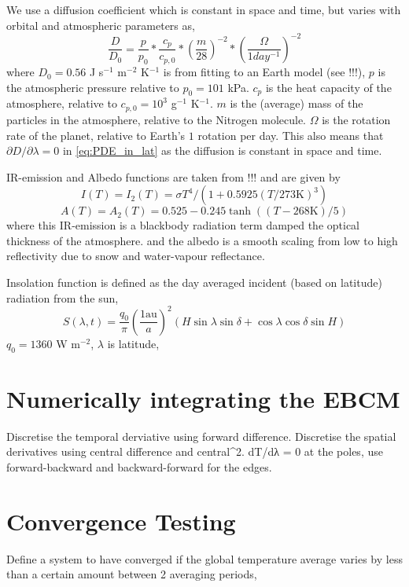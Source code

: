 \documentclass[12pt, onecolumn]{revtex4-2}    %
\begin{document}
We use a diffusion coefficient which is constant in space and time, but varies with orbital and atmospheric parameters as,
$$
    \frac{D}{D_0} = \frac{p}{p_0} * \frac{c_p}{c_{p,0}} * \left(\frac{m}{28}\right)^{-2} * \left(\frac{\Omega}{1 day^{-1}}\right)^{-2}
$$
where $D_0 = 0.56$ J s$^{-1}$ m$^{-2}$ K$^{-1}$ is from fitting to an Earth model (see !!!),
$p$ is the atmospheric pressure relative to $p_0 = 101$ kPa.
$c_p$ is the heat capacity of the atmosphere, relative to $c_{p,0} = 10^3$ g$^{-1}$ K$^{-1}$.
$m$ is the (average) mass of the particles in the atmosphere, relative to the Nitrogen molecule.
$\Omega$ is the rotation rate of the planet, relative to Earth's $1$ rotation per day.
This also means that $\partial D / \partial \lambda = 0$ in \ref{eq:PDE_in_lat} as the diffusion is constant in space and time.

IR-emission and Albedo functions are taken from !!! and are given by
$$
    I(T) = I_2(T) = \sigma T^4 / (1 + 0.5925 (T/273\text{K}) ^ 3)
$$
$$
    A(T) = A_2(T) = 0.525 - 0.245 \tanh((T-268\text{K}) / 5)
$$
where this IR-emission is a blackbody radiation term damped the optical thickness of the atmosphere.
and the albedo is a smooth scaling from low to high reflectivity due to snow and water-vapour reflectance.

Insolation function is defined as the day averaged incident (based on latitude) radiation from the sun,
$$
    S(\lambda, t) = \frac{q_0}{\pi} \left(\frac{1 \text{au}}{a}\right)^2 (H \sin{\lambda} \sin{\delta} + \cos{\lambda} \cos{\delta} \sin{H})
$$
$q_0 = 1360$ W m$^{-2}$, $\lambda$ is latitude,

\section{Numerically integrating the EBCM} \label{sec:solve_PDE}

Discretise the temporal derviative using forward difference.
Discretise the spatial derivatives using central difference and central^2.
dT/dλ = 0 at the poles, use forward-backward and backward-forward for the edges.

\section{Convergence Testing} \label{sec:conv_testing}

Define a system to have converged if the global temperature average varies by less than a certain amount between 2 averaging periods,
\end{document}
